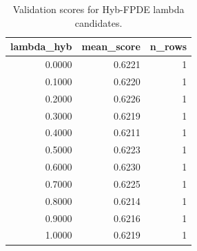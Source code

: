 \begin{table}[t]
\caption{Validation scores for Hyb-FPDE lambda candidates.}
\label{tab:lambda_distribution_computed}
\centering
\begin{tabular}{rrr}
\toprule
lambda\_hyb & mean\_score & n\_rows \\
\midrule
0.0000 & 0.6221 & 1 \\
0.1000 & 0.6220 & 1 \\
0.2000 & 0.6226 & 1 \\
0.3000 & 0.6219 & 1 \\
0.4000 & 0.6211 & 1 \\
0.5000 & 0.6223 & 1 \\
0.6000 & 0.6230 & 1 \\
0.7000 & 0.6225 & 1 \\
0.8000 & 0.6214 & 1 \\
0.9000 & 0.6216 & 1 \\
1.0000 & 0.6219 & 1 \\
\bottomrule
\end{tabular}

\end{table}
